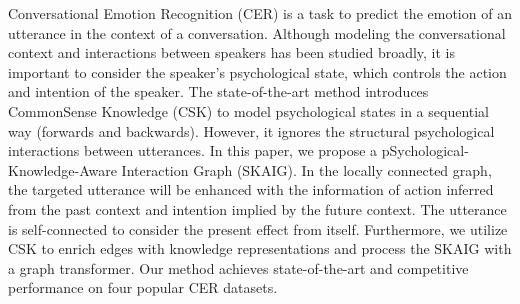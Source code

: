 Conversational Emotion Recognition (CER) is a task to predict the emotion of an utterance in the context of a conversation. Although modeling the conversational context and interactions between speakers has been studied broadly, it is important to consider the speaker's psychological state, which controls the action and intention of the speaker. The state-of-the-art method introduces CommonSense Knowledge (CSK) to model psychological states in a sequential way (forwards and backwards). However, it ignores the structural psychological interactions between utterances. In this paper, we propose a pSychological-Knowledge-Aware Interaction Graph (SKAIG). In the locally connected graph, the targeted utterance will be enhanced with the information of action inferred from the past context and intention implied by the future context. The utterance is self-connected to consider the present effect from itself. Furthermore, we utilize CSK to enrich edges with knowledge representations and process the SKAIG with a graph transformer. Our method achieves state-of-the-art and competitive performance on four popular CER datasets.
